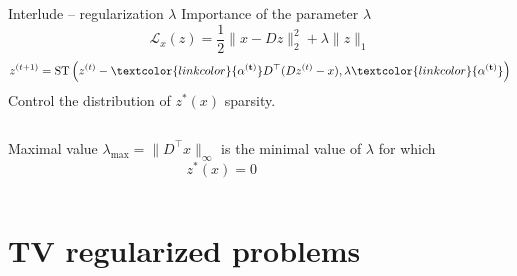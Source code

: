 \documentclass{beamer}
\begin{document}
\appendix

\begin{frame}[t]{Interlude -- regularization $\lambda$}
    Importance of the parameter $\lambda$
    \[
    \mathcal L_x(z) = \frac{1}{2}\|x - Dz\|_2^2 + \lambda \|z\|_1
    \]
   \[
   z^{(t+1)} = \text{ST}\left(z^{(t)}
   - \textcolor{linkcolor}{\bf\alpha^{(t)}} D^\top(D z^{(t)} -x),
   \lambda\textcolor{linkcolor}{\bf\alpha^{(t)}}\right)
   \]
   Control the distribution of $z^*(x)$ sparsity.\\[.5em]
    \begin{columns}[c]
            \begin{block}{Maximal value}
                $\lambda_{\max} = \|D^\top x\|_\infty$ is the minimal value of $\lambda$ for which
                \[
                    z^*(x) = 0
                \]
            \end{block}
    \end{columns}


\end{frame}


\section{TV regularized problems}
\parttitleframe{}
\end{document}
